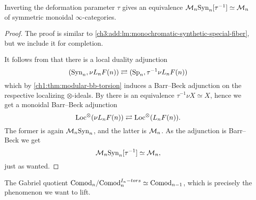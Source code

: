 \begin{lemma}
    Inverting the deformation parameter $\tau$ gives an equivalence $\mathcal{M}_{n}\mathrm{Syn}_n[\tau^{-1}] \simeq \mathcal{M}_{n}$ of symmetric monoidal $\infty$-categories. 
\end{lemma}
\begin{proof}
    The proof is similar to \cref{ch3:add:lm:monochromatic-synthetic-special-fiber}, but we include it for completion. 

    It follows from \citeme that there is a local duality adjunction 
    \[(\mathrm{Syn}_n, \nu L_n F(n)) \rightleftarrows (\mathrm{Sp}_n, \tau^{-1}\nu L_n F(n))\]
    which by \cref{ch1:thm:modular-bb-torsion} induces a Barr--Beck adjunction on the respective localizing $\otimes$-ideals. By \citeme there is an equivalence $\tau^{-1}\nu X \simeq X$, hence we get a monoidal Barr--Beck adjunction 
    \[\operatorname{Loc}^\otimes(\nu L_n F(n))\rightleftarrows \operatorname{Loc}^\otimes(L_n F(n)).\]
    The former is again $\mathcal{M}_{n}\mathrm{Syn}_n$, and the latter is $\mathcal{M}_{n}$. As the adjunction is Barr--Beck we get 
    \[\mathcal{M}_{n}\mathrm{Syn}_n[\tau^{-1}]\simeq \mathcal{M}_{n},\]
    just as wanted. 
\end{proof}















The Gabriel quotient $\mathrm{Comod}_n/\mathrm{Comod}_n^{I_n-tors}\simeq \mathrm{Comod}_{n-1}$, which is precisely the phenomenon we want to lift. 
